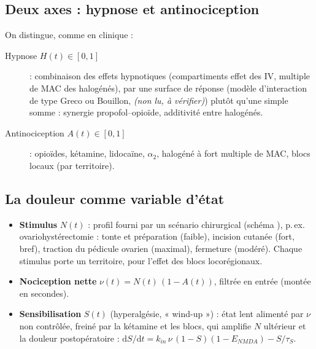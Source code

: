 \documentclass[10pt,a4paper]{article}
\newcommand{\vp}[1]{\text{\texttt{\detokenize{#1}}}}
\newcommand{\alire}{\textcolor{red!70!black}{\textsl{(non lu, à vérifier)}}}
\newcommand{\dd}{\mathrm{d}}
\begin{document}
\subsection{Deux axes : hypnose et antinociception}
On distingue, comme en clinique :
\begin{description}
\item[{Hypnose $H(t)\in[0,1]$}] : combinaison des effets hypnotiques (compartiments effet des IV, multiple de MAC des halogénés),
par une surface de réponse (modèle d'interaction de type Greco ou Bouillon, \alire) plutôt qu'une simple somme : synergie propofol--opioïde,
additivité entre halogénés.
\item[{Antinociception $A(t)\in[0,1]$}] : opioïdes, kétamine, lidocaïne, $\alpha_2$, halogéné à fort multiple de MAC, blocs locaux (par territoire).
\end{description}

\subsection{La douleur comme variable d'état}
\begin{itemize}
\item \textbf{Stimulus} $N(t)$ : profil fourni par un scénario chirurgical (schéma \vp{procedure.schema.json}), p.\,ex. ovariohystérectomie :
tonte et préparation (faible), incision cutanée (fort, bref), traction du pédicule ovarien (maximal), fermeture (modéré).
Chaque stimulus porte un territoire, pour l'effet des blocs locorégionaux.
\item \textbf{Nociception nette} $\nu(t) = N(t)\,(1 - A(t))$, filtrée en entrée (montée en secondes).
\item \textbf{Sensibilisation} $S(t)$ (hyperalgésie, « wind-up ») : état lent alimenté par $\nu$ non contrôlée, freiné par la kétamine
et les blocs, qui amplifie $N$ ultérieur et la douleur postopératoire :
$\dd S/\dd t = k_{in}\,\nu\,(1 - S)(1 - E_{NMDA}) - S/\tau_S$.
\end{itemize}
\end{document}
